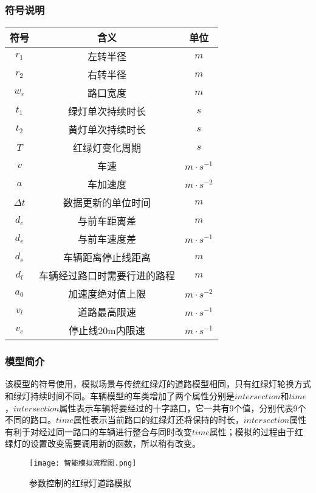 \documentclass[a4paper,12pt]{article}
\numberwithin{equation}{section}
\begin{document}
		\subsubsection{符号说明}
		\setlength\LTleft{0pt}
		\setlength{\tabcolsep}{25pt}
		\begin{longtable}{ccc}
			\\\hline
			\textbf{符号}&\textbf{含义}&\textbf{单位}\\
			\hline

			$r_1$&左转半径&$m$\\\hline
			$r_2$&右转半径&$m$\\\hline
			$w_r$&路口宽度&$m$\\\hline
			$t_1$&绿灯单次持续时长&$s$\\\hline
			$t_2$&黄灯单次持续时长&$s$\\\hline
			$T$&红绿灯变化周期&$s$\\\hline
			$v$&车速&$m\cdot s^{-1}$\\\hline
			$a$&车加速度&$m\cdot s^{-2}$\\\hline
			$\Delta t$&数据更新的单位时间&$m$\\\hline
			$d_c$&与前车距离差&$m$\\\hline
			$d_v$&与前车速度差&$m\cdot s^{-1}$\\\hline
			$d_s$&车辆距离停止线距离&$m$\\\hline
			$d_l$&车辆经过路口时需要行进的路程&$m$\\\hline
			$a_0$&加速度绝对值上限&$m\cdot s^{-2}$\\\hline
			$v_l$&道路最高限速&$m\cdot s^{-1}$\\\hline
			$v_c$&停止线20m内限速&$m\cdot s^{-1}$\\\hline
		\end{longtable}
		\subsubsection{模型简介}
		该模型的符号使用，模拟场景与传统红绿灯的道路模型相同，只有红绿灯轮换方式和绿灯持续时间不同。车辆模型的车类增加了两个属性分别是$intersection$和$time$，$intersection$属性表示车辆将要经过的十字路口，它一共有9个值，分别代表9个不同的路口。$time$属性表示当前路口的红绿灯还将保持的时长，$intersection$属性有利于对经过同一路口的车辆进行整合与同时改变$time$属性；模拟的过程由于红绿灯的设置改变需要调用新的函数，所以稍有改变。
		\begin{figure}[H]
			\centering
			\texttt{[image: 智能模拟流程图.png]}\caption{参数控制的红绿灯道路模拟}
			\label{仿真模拟流程图}
		\end{figure}
\end{document}
